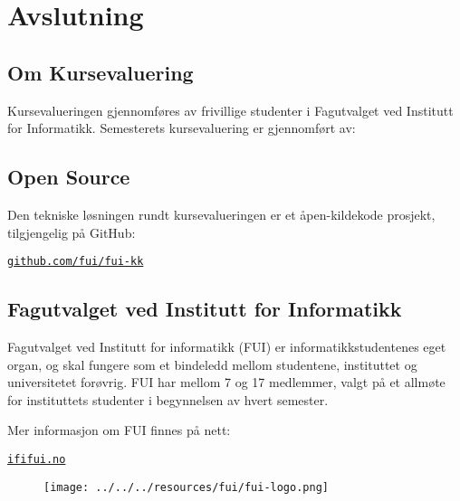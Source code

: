 \chapter{Avslutning}
\newpage

\section{Om Kursevaluering}
Kursevalueringen gjennomføres av frivillige studenter i Fagutvalget ved Institutt for Informatikk.
Semesterets kursevaluering er gjennomført av:\\


\section{Open Source}
Den tekniske løsningen rundt kursevalueringen er et åpen-kildekode prosjekt, tilgjengelig på GitHub:
\begin{center}
\href{https://github.com/fui/fui-kk}{\texttt{github.com/fui/fui-kk}}
\end{center}

\section{Fagutvalget ved Institutt for Informatikk}
Fagutvalget ved Institutt for informatikk (FUI) er informatikkstudentenes eget organ, og skal
fungere som et bindeledd mellom studentene, instituttet og universitetet forøvrig. FUI har mellom 7 og 17 medlemmer, valgt på et allmøte for instituttets studenter i begynnelsen av hvert semester.

Mer informasjon om FUI finnes på nett:
\begin{center}
\href{http://ififui.no/}{\texttt{ififui.no}}
\end{center}

\begin{figure}[H]
\begin{center}
\texttt{[image: ../../../resources/fui/fui-logo.png]}
\end{center}
\end{figure}



